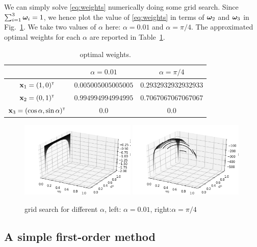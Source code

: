 We can simply solve \eqref{eq:weights} numerically doing some grid search. Since $\sum_{i=1}^3{\boldsymbol \omega}_i = 1$, we hence plot the value of \eqref{eq:weights} in terms of ${\boldsymbol \omega}_2$ and ${\boldsymbol \omega}_3$ in Fig.~\ref{fig:grid}. We take two values of $\alpha$ here: $\alpha=0.01$ and $\alpha=\pi/4$. The approximated optimal weights for each $\alpha$ are reported in Table~\ref{table:weights}.

\begin{table}[t!]
\centering
\def\arraystretch{1.2}
\begin{tabular}{|c|c|c|}
 \hline
 & $\alpha=0.01$ & $\alpha=\pi/4$ \\
 \hline
 \textbf{${\bf x}_1=(1,0)^\mathsf{\scriptscriptstyle T}$} & $0.005005005005005$ & $0.2932932932932933$ \\
 \hline
 \textbf{${\bf x}_2=(0,1)^\mathsf{\scriptscriptstyle T}$} & $0.994994994994995$ & $0.7067067067067067$ \\
 \hline
 \textbf{${\bf x}_3=(\cos\alpha,\sin\alpha)^\mathsf{\scriptscriptstyle T}$} & $0.0$ & $0.0$ \\
 \hline
\end{tabular}
\caption{optimal weights.}
\label{table:weights}
\end{table}

\begin{figure}
    \centering
    \includegraphics[width=0.49\textwidth]{Chapter4/img/0-01.png}
    \includegraphics[width=0.49\textwidth]{Chapter4/img/pi-4.png}
    \caption{grid search for different $\alpha$, left: $\alpha=0.01$, right:$\alpha=\pi/4$}
    \label{fig:grid}
\end{figure}

\subsection{A simple first-order method}

